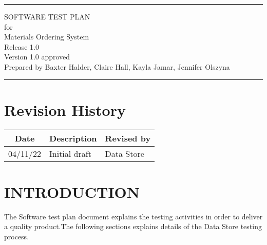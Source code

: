 \documentclass[letterpaper,12pt,oneside,listof=totoc]{scrreprt}
\date{\today}
\author{} %
\def\myversion{1.0 }
\begin{document}
\begin{titlepage}
\flushright
\rule{\textwidth}{5pt}\vskip1cm
\Huge{SOFTWARE TEST PLAN}\\
\vspace{1.5cm}
for\\
\vspace{1.5cm}
Materials Ordering System\\
\vspace{1.5cm}
\LARGE{Release 1.0\\}
\vspace{1.5cm}
\LARGE{Version \myversion approved\\}
\vspace{1.5cm}
Prepared by Baxter Halder, Claire Hall, Kayla Jamar, Jennifer Olszyna\\
\vfill
\rule{\textwidth}{5pt}
\end{titlepage}

\tableofcontents

\listoffigures

\listoftables

\chapter*{Revision History}

\begin{tabular}{| c | p{} | p{} |}
\hline
Date     & Description   & Revised by \\
\hline
04/11/22 & Initial draft & Data Store \\
\hline
\end{tabular}

\chapter{INTRODUCTION}

The Software test plan document explains the testing activities in order to deliver a quality product.The following sections explains details of the Data Store testing process. 
\end{document}
